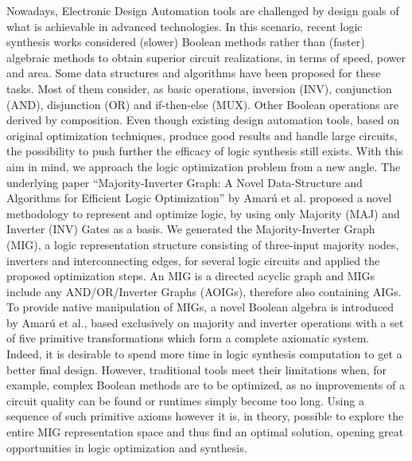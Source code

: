 \documentclass[
	accentcolor=1c,%
	type=intern,
	marginpar=false,
	ruledheaders=section,
	class=report,
	BCOR=5mm,
      parskip=half-,
	fontsize=10pt
	]{tudapub}
\begin{document}
		Nowadays, Electronic Design Automation tools are challenged by design goals of what is
		achievable in advanced technologies. In this scenario, recent logic synthesis works considered
		(slower) Boolean methods rather than (faster) algebraic methods to obtain superior circuit
		realizations, in terms of speed, power and area. Some data structures and algorithms have been
		proposed for these tasks. Most of them consider, as basic operations, inversion (INV),
		conjunction (AND), disjunction (OR) and if-then-else (MUX). Other Boolean operations are derived
		by composition.
		\newline
		\newline
		Even though existing design automation tools, based on original optimization
		techniques, produce good results and handle large circuits, the possibility to push further the
		efficacy of logic synthesis still exists. With this aim in mind, we approach the logic optimization problem from
		a new angle. The underlying paper
		``Majority-Inverter Graph: A Novel Data-Structure and Algorithms for Efficient Logic Optimization''
		by Amarú et al. proposed a novel methodology to represent and optimize logic, by using
		only Majority (MAJ) and Inverter (INV) Gates as a basis. We generated the Majority-Inverter
		Graph (MIG), a logic representation structure consisting of three-input majority nodes, inverters and interconnecting edges, for several logic circuits
		and applied the proposed optimization steps.
		\newline
		\newline
		An MIG is a directed acyclic graph and MIGs include any AND/OR/Inverter Graphs (AOIGs),
		therefore also containing AIGs. To provide native manipulation of MIGs, a novel Boolean algebra is introduced by Amarú et al.,
		based exclusively on majority and inverter operations with a set of five primitive
		transformations which form a complete axiomatic system. Indeed, it is desirable to spend more time in logic
		synthesis computation to get a better final design. However, traditional tools meet their limitations when,
		for example, complex Boolean methods are to be optimized, as no improvements of a circuit quality can be found or
		runtimes simply become too long. Using a sequence of such primitive axioms however it is, in theory, possible to
		explore the entire MIG representation space and thus find an optimal solution, opening great opportunities
		in logic optimization and synthesis.
		\newline
		\newline
\end{document}
